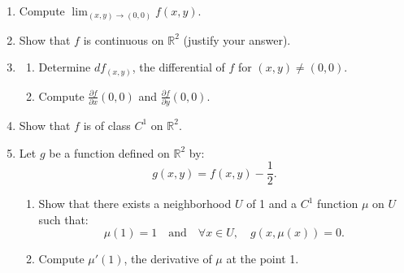 \documentclass[12pt]{article}
\begin{document}
\begin{enumerate}
    \item Compute \(\lim_{(x,y) \to (0,0)} f(x,y)\).
    \item Show that \( f \) is continuous on \( \mathbb{R}^2 \) (justify your answer).
    \item 
    \begin{enumerate}
        \item Determine \( df_{(x,y)} \), the differential of \( f \) for \((x,y) \neq (0,0)\).
        \item Compute \(\frac{\partial f}{\partial x}(0,0)\) and \(\frac{\partial f}{\partial y}(0,0)\).
    \end{enumerate}
    \item Show that \( f \) is of class \( C^1 \) on \( \mathbb{R}^2 \).
    \item Let \( g \) be a function defined on \( \mathbb{R}^2 \) by:
    \[
    g(x,y) = f(x,y) - \frac{1}{2}.
    \]
    \begin{enumerate}
        \item Show that there exists a neighborhood \( U \) of 1 and a \( C^1 \) function \( \mu \) on \( U \) such that:
        \[
        \mu(1) = 1 \quad \text{and} \quad \forall x \in U, \quad g(x,\mu(x)) = 0.
        \]
        \item Compute \( \mu'(1) \), the derivative of \( \mu \) at the point 1.
    \end{enumerate}
\end{enumerate}
\end{document}
